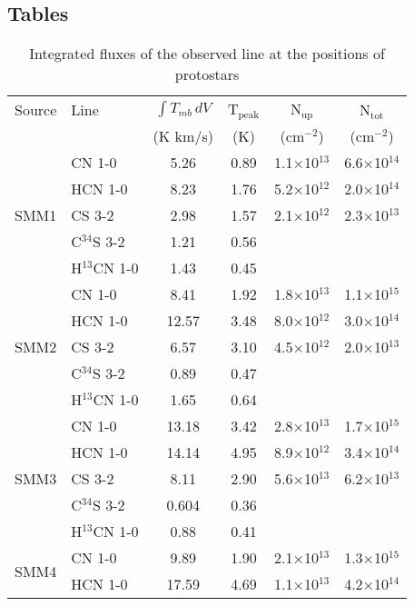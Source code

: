 \documentclass{aa}
\begin{document}
\begin{appendix}
\section{Tables}
\begin{table*}
\caption{Integrated fluxes of the observed line at the positions of protostars}             %
\label{table:fluxes}      %
\centering                          %
\begin{tabular}{l l c c c c} 
\hline\hline 
Source & Line & $\int{T_{mb} \, dV}$ & T$_\mathrm{peak}$ & N$_\mathrm{up}$ & N$_\mathrm{tot}$\\
 &  & (K km/s) & (K) & (cm$^{-2}$) & (cm$^{-2}$) \\
\hline  
\multirow{5}{*}{SMM1} & CN 1-0 & 5.26 & 0.89 & 1.1$\times$10$^{13}$ & 6.6$\times$10$^{14}$\\
{} & HCN 1-0 & 8.23 & 1.76 & 5.2$\times$10$^{12}$ & 2.0$\times$10$^{14}$\\ 
{} & CS 3-2 & 2.98 & 1.57 & 2.1$\times$10$^{12}$ & 2.3$\times$10$^{13}$\\  
{} & C$^{34}$S 3-2 & 1.21 & 0.56 &  & \\ 
{} & H$^{13}$CN 1-0 & 1.43 & 0.45 &  & \\ 
\hline
\multirow{5}{*}{SMM2} & CN 1-0 & 8.41 & 1.92 & 1.8$\times$10$^{13}$ & 1.1$\times$10$^{15}$ \\
{} & HCN 1-0 & 12.57 & 3.48 & 8.0$\times$10$^{12}$ & 3.0$\times$10$^{14}$\\ 
{} & CS 3-2 & 6.57 & 3.10 & 4.5$\times$10$^{12}$ & 2.0$\times$10$^{13}$\\  
{} & C$^{34}$S 3-2 & 0.89 & 0.47 & &\\
{} & H$^{13}$CN 1-0 & 1.65 & 0.64 &  & \\ 
\hline
\multirow{5}{*}{SMM3} & CN 1-0 & 13.18 & 3.42 & 2.8$\times$10$^{13}$ & 1.7$\times$10$^{15}$\\
{} & HCN 1-0 & 14.14 & 4.95 & 8.9$\times$10$^{12}$ & 3.4$\times$10$^{14}$\\ 
{} & CS 3-2 & 8.11 & 2.90 & 5.6$\times$10$^{13}$ & 6.2$\times$10$^{13}$ \\  
{} & C$^{34}$S 3-2 & 0.604 & 0.36 &  & \\
{} & H$^{13}$CN 1-0 & 0.88 & 0.41 &  & \\ 
\hline
\multirow{5}{*}{SMM4} & CN 1-0 & 9.89 & 1.90 & 2.1$\times$10$^{13}$ & 1.3$\times$10$^{15}$\\
{} & HCN 1-0 & 17.59 & 4.69 & 1.1$\times$10$^{13}$ & 4.2$\times$10$^{14}$\\ 

\end{tabular}
\end{table*}
\end{appendix}
\end{document}
